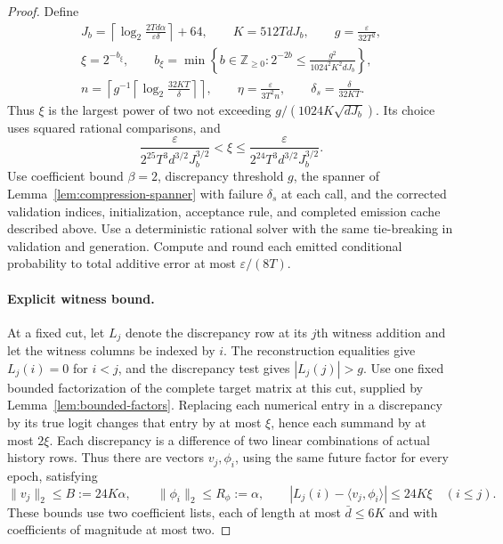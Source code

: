 \documentclass[11pt]{article}
\theoremstyle{definition}
\theoremstyle{remark}
\begin{document}
\begin{proof}
Define
\begin{equation}\label{eq:explicit-gls-parameters}
\begin{gathered}
J_b=\left\lceil\log_2\frac{2Td\alpha}{\varepsilon\delta}\right\rceil+64,
\qquad K=512TdJ_b,\qquad g=\frac{\varepsilon}{32T^2},\\
\xi=2^{-b_\xi},\qquad
b_\xi=\min\left\{b\in\mathbb Z_{\ge0}:
2^{-2b}\le\frac{g^2}{1024^2K^2dJ_b}\right\},\\
n=\left\lceil
g^{-1}\left\lceil\log_2\frac{32KT}{\delta}\right\rceil
\right\rceil,\qquad
\eta=\frac{\varepsilon}{3T^2n},\qquad
\delta_s=\frac{\delta}{32KT}.
\end{gathered}
\end{equation}
Thus $\xi$ is the largest power of two not exceeding
$g/(1024K\sqrt{dJ_b})$. Its choice uses squared rational comparisons, and
\begin{equation}\label{eq:explicit-gls-tolerance}
\frac{\varepsilon}{2^{25}T^3d^{3/2}J_b^{3/2}}
<\xi\le
\frac{\varepsilon}{2^{24}T^3d^{3/2}J_b^{3/2}}.
\end{equation}
Use coefficient bound $\beta=2$, discrepancy threshold $g$, the spanner of Lemma~\ref{lem:compression-spanner} with failure $\delta_s$ at each call, and the corrected validation indices, initialization, acceptance rule, and completed emission cache described above. Use a deterministic rational solver with the same tie-breaking in validation and generation. Compute and round each emitted conditional probability to total additive error at most $\varepsilon/(8T)$.

\paragraph{Explicit witness bound.}
At a fixed cut, let $L_j$ denote the discrepancy row at its $j$th witness addition and let the witness columns be indexed by $i$. The reconstruction equalities give $L_j(i)=0$ for $i<j$, and the discrepancy test gives $|L_j(j)|>g$. Use one fixed bounded factorization of the complete target matrix at this cut, supplied by Lemma~\ref{lem:bounded-factors}. Replacing each numerical entry in a discrepancy by its true logit changes that entry by at most $\xi$, hence each summand by at most $2\xi$. Each discrepancy is a difference of two linear combinations of actual history rows. Thus there are vectors $v_j,\phi_i$, using the same future factor for every epoch, satisfying
\[
\|v_j\|_2\le B:=24K\alpha,\qquad
\|\phi_i\|_2\le R_\phi:=\alpha,\qquad
|L_j(i)-\langle v_j,\phi_i\rangle|\le24K\xi
\quad(i\le j).
\]
These bounds use two coefficient lists, each of length at most $\bar d\le6K$ and with coefficients of magnitude at most two.


\end{proof}
\end{document}
